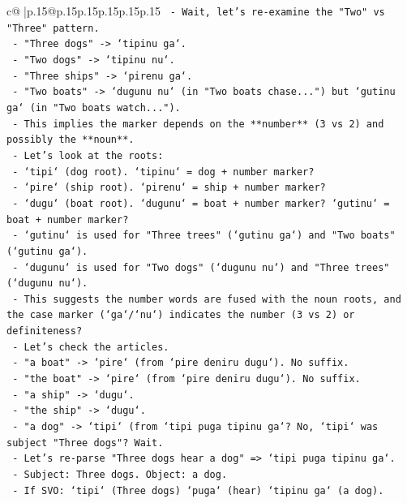 \documentclass{article}
\begin{document}
{\begin{supertabular}{c@{$\;$}|p{.15\linewidth}@{}p{.15\linewidth}p{.15\linewidth}p{.15\linewidth}p{.15\linewidth}p{.15\linewidth}}
{{{\texttt{   {-} Wait, let's re{-}examine the "Two" vs "Three" pattern.} \\
\texttt{     {-} "Three dogs" {-}> `tipinu ga`.} \\
\texttt{     {-} "Two dogs" {-}> `tipinu nu`.} \\
\texttt{     {-} "Three ships" {-}> `pirenu ga`.} \\
\texttt{     {-} "Two boats" {-}> `dugunu nu` (in "Two boats chase...") but `gutinu ga` (in "Two boats watch...").} \\
\texttt{     {-} This implies the marker depends on the **number** (3 vs 2) and possibly the **noun**.} \\
\texttt{     {-} Let's look at the roots:} \\
\texttt{       {-} `tipi` (dog root). `tipinu` = dog + number marker?} \\
\texttt{       {-} `pire` (ship root). `pirenu` = ship + number marker?} \\
\texttt{       {-} `dugu` (boat root). `dugunu` = boat + number marker? `gutinu` = boat + number marker?} \\
\texttt{       {-} `gutinu` is used for "Three trees" (`gutinu ga`) and "Two boats" (`gutinu ga`).} \\
\texttt{       {-} `dugunu` is used for "Two dogs" (`dugunu nu`) and "Three trees" (`dugunu nu`).} \\
\texttt{       {-} This suggests the number words are fused with the noun roots, and the case marker (`ga`/`nu`) indicates the number (3 vs 2) or definiteness?} \\
\texttt{       {-} Let's check the articles.} \\
\texttt{         {-} "a boat" {-}> `pire` (from `pire deniru dugu`). No suffix.} \\
\texttt{         {-} "the boat" {-}> `pire` (from `pire deniru dugu`). No suffix.} \\
\texttt{         {-} "a ship" {-}> `dugu`.} \\
\texttt{         {-} "the ship" {-}> `dugu`.} \\
\texttt{         {-} "a dog" {-}> `tipi` (from `tipi puga tipinu ga`? No, `tipi` was subject "Three dogs"? Wait.} \\
\texttt{         {-} Let's re{-}parse "Three dogs hear a dog" => `tipi puga tipinu ga`.} \\
\texttt{           {-} Subject: Three dogs. Object: a dog.} \\
\texttt{           {-} If SVO: `tipi` (Three dogs) `puga` (hear) `tipinu ga` (a dog).} \\
}}}
\end{supertabular}}
\end{document}
